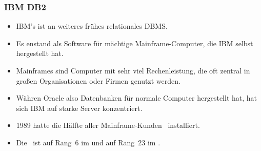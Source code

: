 \documentclass[aspectratio=169,mathserif,notheorems]{beamer}%
\begin{document}
%
\begin{frame}%
\frametitle{IBM DB2}%
\begin{itemize}%
\item IBM's \ibmDB\cite{CWDS2007UDLVWE,BBBCCDMMP2016SPTAFOIDFI} ist an weiteres frühes relationales DBMS\cite{HS2013THAGOID}.%
\item<2-> Es enstand als Software für mächtige Mainframe-Computer, die IBM selbst hergestellt hat.%
\item<3-> Mainframes sind Computer mit sehr viel Rechenleistung, die oft zentral in großen Organisationen oder Firmen genutzt werden.%
\item<4-> Währen Oracle also Datenbanken für normale Computer hergestellt hat, hat sich IBM auf starke Server konzentriert.%
\item<5-> 1989 hatte die Hälfte aller Mainframe-Kunden \ibmDB\ installiert\cite{HS2013THAGOID}.%
\item<6-> Die \ibmDB\ ist auf Rang~6 im \cite{RS2025DERORD} und auf Rang~23 im \cite{SE:SO:2024DS}.%
\end{itemize}%
\end{frame}%
%
\end{document}
